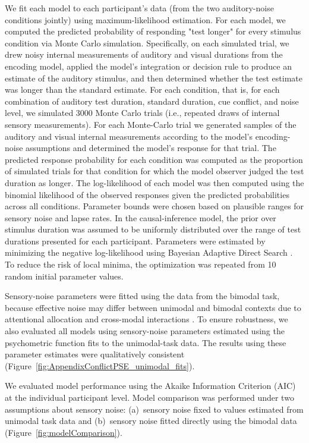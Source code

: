 \documentclass{jov}
\providecommand{\citep}[1]{\cite{#1}}
\begin{document}
We fit each model to each participant's data (from the two auditory-noise conditions jointly) using maximum-likelihood estimation. For each model, we computed the predicted probability of responding "test longer" for every stimulus condition via Monte Carlo simulation. Specifically, on each simulated trial, we drew noisy internal measurements of auditory and visual durations from the encoding model, applied the model's integration or decision rule to produce an estimate of the auditory stimulus, and then determined whether the test estimate was longer than the standard estimate. For each condition, that is, for each combination of auditory test duration, standard duration, cue conflict, and noise level, we simulated 3000 Monte Carlo trials (i.e., repeated draws of internal sensory measurements). For each Monte-Carlo trial we generated samples of the auditory and visual internal measurements according to the model's encoding-noise assumptions and determined the model's response for that trial. The predicted response probability for each condition was computed as the proportion of simulated trials for that condition for which the model observer judged the test duration as longer. The log-likelihood of each model was then computed using the binomial likelihood of the observed responses given the predicted probabilities across all conditions. Parameter bounds were chosen based on plausible ranges for sensory noise and lapse rates. In the causal-inference model, the prior over stimulus duration was assumed to be uniformly distributed over the range of test durations presented for each participant. Parameters were estimated by minimizing the negative log-likelihood using Bayesian Adaptive Direct Search \citep{acerbi2017practical}. To reduce the risk of local minima, the optimization was repeated from 10 random initial parameter values.

Sensory-noise parameters were fitted using the data from the bimodal task, because effective noise may differ between unimodal and bimodal contexts due to attentional allocation and cross-modal interactions \citep{badde2020modality}. To ensure robustness, we also evaluated all models using sensory-noise parameters estimated using the psychometric function fits to the unimodal-task data. The results using these parameter estimates were qualitatively consistent (Figure~\ref{fig:AppendixConflictPSE_unimodal_fits}).

We evaluated model performance using the Akaike Information Criterion (AIC) at the individual participant level. Model comparison was performed under two assumptions about sensory noise: (a)~sensory noise fixed to values estimated from unimodal task data and (b)~sensory noise fitted directly using the bimodal data (Figure~\ref{fig:modelComparison}). 
\end{document}

